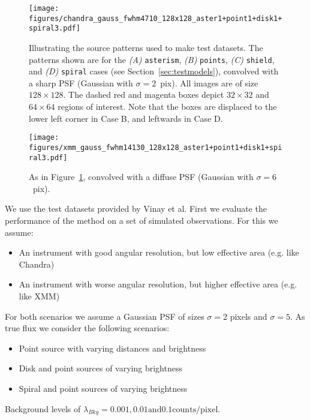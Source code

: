 \documentclass[twocolumn]{aastex631}
\begin{document}
    \begin{figure*}
        \centering\texttt{[image: figures/chandra\_gauss\_fwhm4710\_128x128\_aster1+point1+disk1+spiral3.pdf]}
        \caption{Illustrating the source patterns used to make test datasets.  The patterns shown are for the {\sl (A)} {\tt asterism}, {\sl (B)} {\tt points}, {\sl (C)} {\tt shield}, and {\sl (D)} {\tt spiral} cases (see Section~\ref{sec:testmodels}), convolved with a sharp PSF (Gaussian with $\sigma=2$~pix).  All images are of size $128{\times}128$.  The dashed red and magenta boxes depict $32{\times}32$ and $64{\times}64$ regions of interest.  Note that the boxes are displaced to the lower left corner in Case B, and leftwards in Case D.}
        \label{fig:simulated_models_chandra}
    \end{figure*}
     
    \begin{figure*}
        \centering\texttt{[image: figures/xmm\_gauss\_fwhm14130\_128x128\_aster1+point1+disk1+spiral3.pdf]}
        \caption{As in Figure~\ref{fig:simulated_models_chandra}, convolved with a diffuse PSF (Gaussian with $\sigma=6$~pix).}
        \label{fig:simulated_models_xmm}
    \end{figure*}

    We use the test datasets provided by Vinay et al.
    First we evaluate the performance of the method on a set of simulated observations.
    For this we assume:

    \begin{itemize}
        \item An instrument with good angular resolution, but low effective area (e.g. like Chandra)
        \item An instrument with worse angular resolution, but higher effective area (e.g. like XMM)
    \end{itemize}

    For both scenarios we assume a Gaussian PSF of sizes $\sigma = 2$ pixels and  $\sigma = 5$.
    As true flux we consider the following scenarios:

    \begin{itemize}
        \item Point source with varying distances and brightness
        \item Disk and point sources of varying brightness
        \item Spiral and point sources of varying brightness
    \end{itemize}

    Background levels of $\lambda_{Bkg}= 0.001, 0.01 \textrm{and} 0.1 \textrm{counts/pixel}$. 
    
\end{document}
